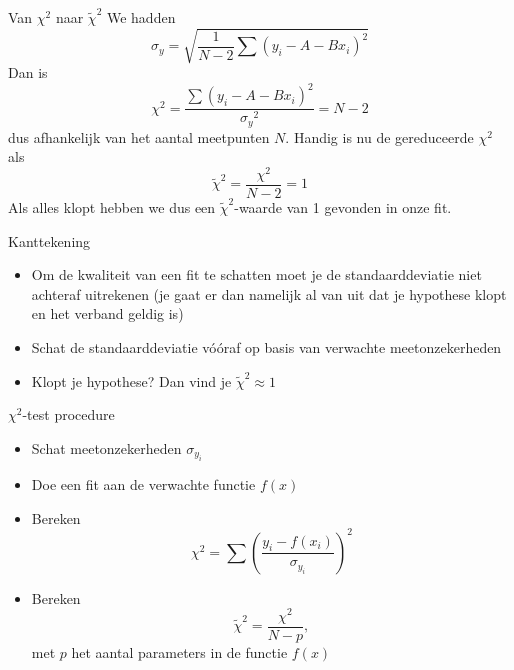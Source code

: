 \documentclass{beamer}
\newcommand{\rchisq}{\tilde\chi^2}
\begin{document}
\begin{frame}{Van $\chi^2$ naar $\rchisq$}
  We hadden
  \begin{equation*}
    \sigma_y = \sqrt{\frac{1}{N-2}\sum(y_i - A - Bx_i)^2}
  \end{equation*}
  Dan is
  \begin{equation*}
    \chi^2 = \frac{\sum(y_i - A - Bx_i)^2}{{\sigma_y}^2} = N - 2
  \end{equation*}
  dus afhankelijk van het aantal meetpunten $N$. Handig is nu de \alert{gereduceerde $\chi^2$} als
  \begin{equation*}
    \rchisq = \frac{\chi^2}{N - 2} = 1
  \end{equation*}
  Als alles klopt hebben we dus een $\rchisq$-waarde van 1 gevonden in onze fit.
\end{frame}

\begin{frame}{Kanttekening}
  \begin{itemize}
    \item Om de kwaliteit van een fit te schatten moet je de standaarddeviatie niet achteraf uitrekenen (je gaat er dan namelijk al van uit dat je hypothese klopt en het verband geldig is)
    \pause
    \item Schat de standaarddeviatie vóóraf op basis van verwachte meetonzekerheden
    \pause
    \item Klopt je hypothese? Dan vind je $\rchisq \approx 1$
  \end{itemize}
\end{frame}

\begin{frame}{$\chi^2$-test procedure}
  \begin{itemize}
    \item Schat meetonzekerheden $\sigma_{y_i}$
    \item Doe een fit aan de verwachte functie $f(x)$
    \item Bereken
    \begin{equation*}
      \chi^2 = \sum\left(\frac{y_i - f(x_i)}{\sigma_{y_i}}\right)^2
    \end{equation*}
    \item Bereken
    \begin{equation*}
      \rchisq = \frac{\chi^2}{N - p},
    \end{equation*}
    met $p$ het aantal parameters in de functie $f(x)$
  \end{itemize}
\end{frame}
\end{document}
